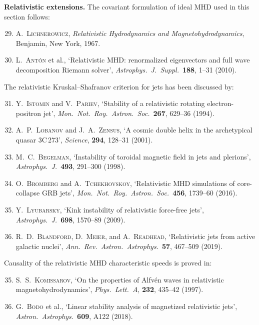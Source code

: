 \medskip\noindent
\textbf{Relativistic extensions.}  The covariant formulation of ideal
MHD used in this section follows:
\begin{enumerate}
\setcounter{enumi}{28}
\item A.~\textsc{Lichnerowicz}, \emph{Relativistic Hydrodynamics and
  Magnetohydrodynamics}, Benjamin, New York, 1967.
\item L.~\textsc{Ant\'on} et al., `Relativistic MHD: renormalized
  eigenvectors and full wave decomposition Riemann solver',
  \emph{Astrophys.\ J.\ Suppl.}\ \textbf{188}, 1--31 (2010).
\end{enumerate}
The relativistic Kruskal--Shafranov criterion for jets has been
discussed by:
\begin{enumerate}
\setcounter{enumi}{30}
\item Y.~\textsc{Istomin} and V.~\textsc{Pariev}, `Stability of a
  relativistic rotating electron-positron jet', \emph{Mon.\ Not.\
  Roy.\ Astron.\ Soc.}\ \textbf{267}, 629--36 (1994).
\item A.~P.~\textsc{Lobanov} and J.~A.~\textsc{Zensus}, `A cosmic
  double helix in the archetypical quasar 3C\,273', \emph{Science},
  \textbf{294}, 128--31 (2001).
\item M.~C.~\textsc{Begelman}, `Instability of toroidal magnetic
  field in jets and plerions', \emph{Astrophys.\ J.}\ \textbf{493},
  291--300 (1998).
\item O.~\textsc{Bromberg} and A.~\textsc{Tchekhovskoy}, `Relativistic
  MHD simulations of core-collapse GRB jets', \emph{Mon.\ Not.\ Roy.\
  Astron.\ Soc.}\ \textbf{456}, 1739--60 (2016).

\item Y.~\textsc{Lyubarsky}, `Kink instability of relativistic
  force-free jets', \emph{Astrophys.\ J.}\ \textbf{698}, 1570--89
  (2009).

\item R.~D.~\textsc{Blandford}, D.~\textsc{Meier}, and
  A.~\textsc{Readhead}, `Relativistic jets from active galactic
  nuclei', \emph{Ann.\ Rev.\ Astron.\ Astrophys.}\ \textbf{57},
  467--509 (2019).
\end{enumerate}
Causality of the relativistic MHD characteristic speeds is proved in:
\begin{enumerate}
\setcounter{enumi}{34}
\item S.~S.~\textsc{Komissarov}, `On the properties of Alfv\'en
  waves in relativistic magnetohydrodynamics', \emph{Phys.\ Lett.\
  A}, \textbf{232}, 435--42 (1997).
\item G.~\textsc{Bodo} et al., `Linear stability analysis of
  magnetized relativistic jets', \emph{Astron.\ Astrophys.}\
  \textbf{609}, A122 (2018).
\end{enumerate}

